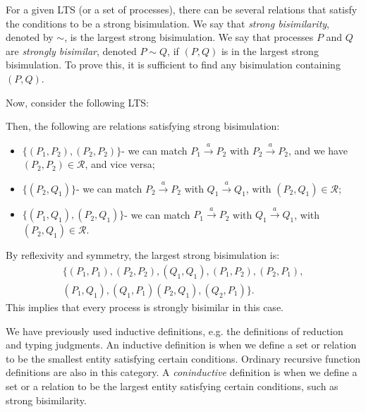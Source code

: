 \documentclass[a4paper, openany]{memoir}
\theoremstyle{definition}
\begin{document}
    For a given LTS (or a set of processes), there can be several relations that satisfy the conditions to be a strong bisimulation. We say that \emph{strong bisimilarity}, denoted by $\sim$, is the largest strong bisimulation. We say that processes $P$ and $Q$ are \emph{strongly bisimilar}, denoted $P \sim Q$, if $(P, Q)$ is in the largest strong bisimulation. To prove this, it is sufficient to find any bisimulation containing $(P, Q)$.

    Now, consider the following LTS:
    \begin{figure}[H]
        \centering
    \end{figure}
    Then, the following are relations satisfying strong bisimulation:
    \begin{itemize}
        \item $\{(P_1, P_2), (P_2, P_2)\}$- we can match $P_1 \xrightarrow{a} P_2$ with $P_2 \xrightarrow{a} P_2$, and we have $(P_2, P_2) \in \mathcal{R}$, and vice versa;
        \item $\{(P_2, Q_1)\}$- we can match $P_2 \xrightarrow{a} P_2$ with $Q_1 \xrightarrow{a} Q_1$, with $(P_2, Q_1) \in \mathcal{R}$;
        \item $\{(P_1, Q_1), (P_2, Q_1)\}$- we can match $P_1 \xrightarrow{a} P_2$ with $Q_1 \xrightarrow{a} Q_1$, with $(P_2, Q_1) \in \mathcal{R}$.
    \end{itemize}
    By reflexivity and symmetry, the largest strong bisimulation is:
    \begin{align*}
        \{(P_1, P_1), (P_2, P_2), (Q_1, Q_1), (P_1, P_2), (P_2, P_1), \\
        (P_1, Q_1), (Q_1, P_1) (P_2, Q_1), (Q_2, P_1)\}.
    \end{align*}
    This implies that every process is strongly bisimilar in this case.

    We have previously used inductive definitions, e.g. the definitions of reduction and typing judgments. An inductive definition is when we define a set or relation to be the smallest entity satisfying certain conditions. Ordinary recursive function definitions are also in this category. A \emph{coninductive} definition is when we define a set or a relation to be the largest entity satisfying certain conditions, such as strong bisimilarity.
\end{document}

